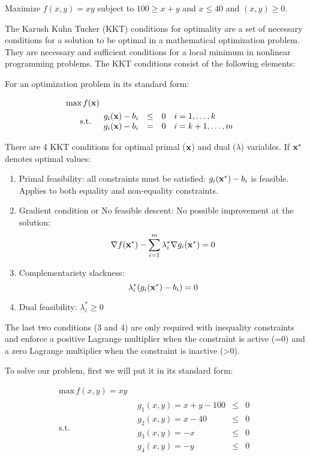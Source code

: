 \Exercise Maximize $f(x,y)=xy$ subject to $100 \geq x+y$ and $x\leq 40$ and $(x,y)\geq0$.

\Answer 

The Karush Kuhn Tucker (KKT) conditions  for optimality are a set of necessary conditions for a solution to be optimal in a mathematical optimization problem. They are necessary and sufficient conditions for a local minimum in nonlinear programming problems. The KKT conditions consist of the following elements:

For an optimization problem in its standard form:

\begin{equation*}
  \begin{aligned}
    \text{max} \, f(\textbf{x}) \\
    \text{s.t.}\quad &
    \begin{array}{rcl}
      g_i(\textbf{x})-b_i  & \leq & 0 \quad i=1,\ldots,k \\
      g_i(\textbf{x})-b_i  & = & 0 \quad i=k+1,\ldots,m \\
    \end{array}
  \end{aligned}
\end{equation*}

There are 4 KKT conditions for optimal primal ($\textbf{x}$) and dual ($\lambda$) variables. If $\textbf{x}^*$ denotes optimal values:
\begin{enumerate}
  \item Primal feasibility: all constraints must be satisfied: $g_i(\textbf{x}^*)-b_i$ is feasible. Applies to both equality and non-equality constraints.
  \item Gradient condition or No feasible descent: No possible improvement at the solution: 
  \[ \nabla f(\textbf{x}^*)-\sum_{i=1}^m \lambda_i^* \nabla g_i (\textbf{x}^*)=0\]
  \item Complementariety slackness: 
  \[\lambda_i^* (g_i(\textbf{x}^*)-b_i)=0\]
  \item Dual feasibility: $\lambda_i^*\geq 0$
\end{enumerate}

The last two conditions (3 and 4) are only required with inequality constraints and enforce a positive Lagrange multiplier when the constraint is active (=0) and a zero Lagrange multiplier when the constraint is inactive (>0). 

To solve our problem, first we will put it in its standard form:


\begin{equation}
  \begin{aligned}
    \text{max} \, f(x,y)=xy \\
    \text{s.t.}\quad &
    \begin{array}{rcl}
      g_1(x,y)=x+y-100  & \leq & 0  \\
      g_2(x,y)=x-40 & \leq & 0  \\
      g_3(x,y)=-x&\leq&0\\
      g_4(x,y)=-y&\leq&0\\
    \end{array}
  \end{aligned}
  \label{Eq:KKT}
\end{equation}

